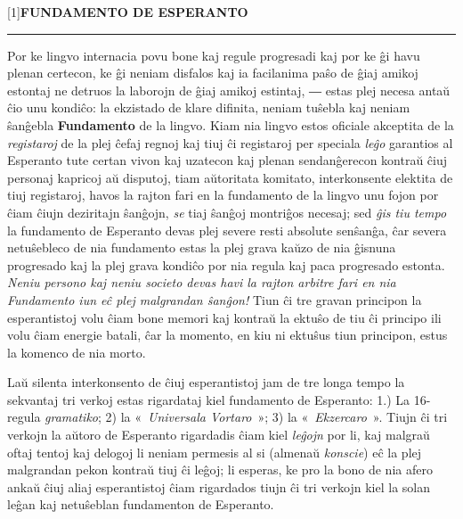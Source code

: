 \label{antau}
\fancyhead[LE,RO]{\footnotesize\thepage}
\fancyhead[CE]{\footnotesize\narrow{\leftmark}}
\fancyhead[CO]{\footnotesize\narrow{\rightmark}}
\thispagestyle{plain}

\vspace*{2ex}

\begin{center}
\scalebox{0.6}[1]{\Huge\bf FUNDAMENTO DE ESPERANTO}

\rule{0.9\textwidth}{0.4pt}
\end{center}

\vspace*{3ex}


Por ke lingvo internacia povu bone kaj regule progresadi kaj por ke ĝi havu plenan certecon, ke ĝi neniam disfalos kaj ia facilanima paŝo de ĝiaj amikoj estontaj ne detruos la laborojn de ĝiaj amikoj estintaj, ― estas plej necesa antaŭ ĉio unu kondiĉo: la ekzistado de klare difinita, neniam tuŝebla kaj neniam ŝanĝebla \textbf{Fundamento} de la lingvo. Kiam nia lingvo estos oficiale akceptita de la \emph{registaroj} de la plej ĉefaj regnoj kaj tiuj ĉi registaroj per speciala \emph{leĝo} garantios al Esperanto tute certan vivon kaj uzatecon kaj plenan sendanĝerecon kontraŭ ĉiuj personaj kapricoj aŭ disputoj, tiam aŭtoritata komitato, interkonsente elektita de tiuj registaroj, havos la rajton fari en la fundamento de la lingvo unu fojon por ĉiam ĉiujn deziritajn ŝanĝojn, \emph{se} tiaj ŝanĝoj montriĝos necesaj; sed \emph{ĝis tiu tempo} la fundamento de Esperanto devas plej severe resti absolute senŝanĝa, ĉar severa netuŝebleco de nia fundamento estas la plej grava kaŭzo de nia ĝisnuna progresado kaj la plej grava kondiĉo por nia regula kaj paca progresado estonta. \emph{Neniu persono kaj neniu societo devas havi la rajton arbitre fari en nia Fundamento iun eĉ plej malgrandan ŝanĝon!} Tiun ĉi tre gravan principon la esperantistoj volu ĉiam bone memori kaj kontraŭ la ektuŝo de tiu ĉi principo ili volu ĉiam energie batali, ĉar la momento, en kiu ni ektuŝus tiun principon, estus la komenco de nia morto.

Laŭ silenta interkonsento de ĉiuj esperantistoj jam de tre longa tempo la sekvantaj tri verkoj estas rigardataj kiel fundamento de Esperanto: 1.) La 16-regula \emph{gramatiko}; 2) la «~\emph{Universala Vortaro}~»; 3) la «~\emph{Ekzercaro}~». Tiujn ĉi tri verkojn la aŭtoro de Esperanto rigardadis ĉiam kiel \emph{leĝojn} por li, kaj malgraŭ oftaj tentoj kaj delogoj li neniam permesis al si (almenaŭ \emph{konscie}) eĉ la plej malgrandan pekon kontraŭ tiuj ĉi leĝoj; li esperas, ke pro la bono de nia afero ankaŭ ĉiuj aliaj esperantistoj ĉiam rigardados tiujn ĉi tri verkojn kiel la solan leĝan kaj netuŝeblan fundamenton de Esperanto.

